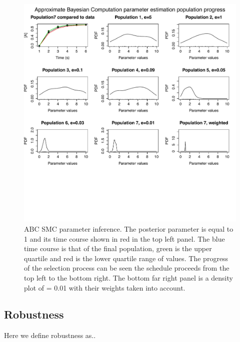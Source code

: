 \begin{figure}[htbp]
    \begin{center}
    \includegraphics[scale=0.6]{chapterStabilityFinder/images/abcsmc_ex.pdf}
    \caption[\acrshort{abc} \acrshort{smc} example]{ABC SMC parameter inference. The posterior parameter is equal to 1 and its time course shown in red in the top left panel. The blue time course is that of the final population, green is the upper quartile and red is the lower quartile range of values. The progress of the selection process can be seen the \textepsilon schedule proceeds from the top left to the bottom right. The bottom far right panel is a density plot of \textepsilon = 0.01 with their weights taken into account.  }
    \label{fig:myABC true 1}
    \end{center}
\end{figure}
\clearpage


\subsection{Robustness}

{\color{red} Here we define robustness as.. }


